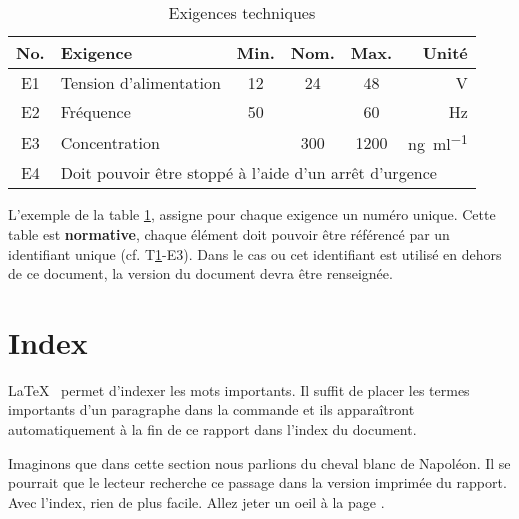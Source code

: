 \begin{table}[h]
    \begin{center}
        \caption{Exigences techniques \label{specification}}
        \begin{tabularx}{\textwidth}{cXcccr}
            \toprule
            No. & Exigence                                                                   & Min. & Nom. & Max. & Unité                           \\
            \midrule
            E1  & Tension d'alimentation                                                     & 12   & 24   & 48   & \si{\volt}                      \\
            E2  & Fréquence                                                                  & 50   &      & 60   & \si{\hertz}                     \\
            E3  & Concentration                                                              &      & 300  & 1200 & \si{\nano\gram\per\milli\litre} \\
            E4  & \multicolumn{5}{l}{Doit pouvoir être stoppé à l'aide d'un arrêt d'urgence}                                                        \\
            \bottomrule
        \end{tabularx}
    \end{center}
\end{table}

L'exemple de la table \ref{specification}, assigne pour chaque exigence un numéro unique. Cette table est \textbf{normative}, chaque élément doit pouvoir être référencé par un identifiant unique (cf. T\ref{specification}-E3). Dans le cas ou cet identifiant est utilisé en dehors de ce document, la version du document devra être renseignée.

\section{Index}
\LaTeX~ permet d'indexer les mots  importants. Il suffit de placer les termes importants d'un paragraphe dans la commande \texttt{} et ils apparaîtront automatiquement à la fin de ce rapport dans l'index du document.


Imaginons que dans cette section nous parlions du cheval blanc  de Napoléon. Il se pourrait que le lecteur recherche ce passage dans la version imprimée du rapport. Avec l'index, rien de plus facile. Allez jeter un oeil à la page \pageref{index}.

